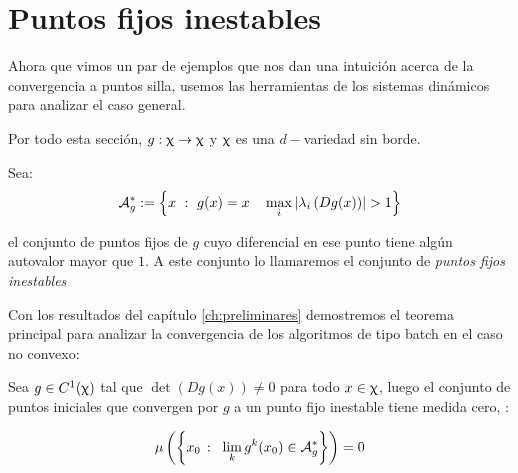\section{Puntos fijos inestables}

Ahora que vimos un par de ejemplos que nos dan una intuici\'on acerca de la convergencia a puntos silla, usemos las herramientas de los sistemas din\'amicos para analizar el caso general.

Por todo esta secci\'on, $g: \upchi \rightarrow \upchi$ y $\upchi$ es una $d-$variedad sin borde.

\begin{definition}
	Sea:
	\begin{equation*}
	\label{def:punto fijo inestable de g}
	\mathcal{A}_{g}^{*} := \left\lbrace x \ : \ g(x) = x \quad \max\limits_{i}\left\lvert\lambda_i \left(Dg(x)\right)\right\rvert > 1\right\rbrace
	\end{equation*}
	
	el conjunto de puntos fijos de $g$ cuyo diferencial en ese punto tiene alg\'un autovalor mayor que $1$. A este conjunto lo llamaremos el conjunto de \textit{puntos fijos inestables}
	
\end{definition}

Con los resultados del cap\'itulo \ref{ch:preliminares} demostremos el teorema principal para analizar la convergencia de los algoritmos de tipo batch en el caso no convexo:

\begin{theorem}
	\label{teo: Principal}
	Sea $g \in C^1(\upchi)$ tal que $\det\left(Dg(x)\right) \neq 0$ para todo $x \in \upchi$, luego el conjunto de puntos iniciales que convergen por $g$ a un punto fijo inestable tiene medida cero, \ie:
	
	\begin{equation*}
	\mu \left(\sett{x_0 \ \colon \ \Biglim{k}{g^k(x_0) \in \mathcal{A}_g^{*}}}\right) = 0
	\end{equation*}
\end{theorem}

